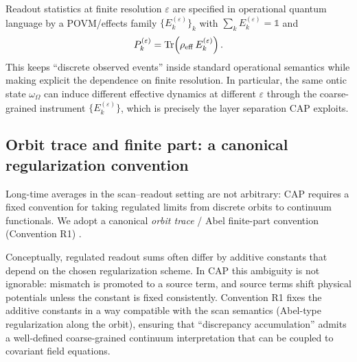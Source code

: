 Readout statistics at finite resolution $\varepsilon$ are specified in operational quantum language by a POVM/effects family $\{E_k^{(\varepsilon)}\}_k$ with $\sum_k E_k^{(\varepsilon)}=\mathds{1}$ and
\begin{equation}
  P_k^{(\varepsilon)} = \mathrm{Tr}\!\left(\rho_{\mathrm{eff}}\, E_k^{(\varepsilon)}\right).
\end{equation}
This keeps ``discrete observed events'' inside standard operational semantics while making explicit the dependence on finite resolution. In particular, the same ontic state $\omega_\Omega$ can induce different effective dynamics at different $\varepsilon$ through the coarse-grained instrument $\{E_k^{(\varepsilon)}\}$, which is precisely the layer separation CAP exploits.

\subsection{Orbit trace and finite part: a canonical regularization convention}
\label{subsec:orbit_trace}

Long-time averages in the scan--readout setting are not arbitrary: CAP requires a fixed convention for taking regulated limits from discrete orbits to continuum functionals. We adopt a canonical \emph{orbit trace} / Abel finite-part convention (Convention R1) \cite{Ma2025HPOT,Ma2025HPA,EstradaKanwal2002}.

Conceptually, regulated readout sums often differ by additive constants that depend on the chosen regularization scheme. In CAP this ambiguity is not ignorable: mismatch is promoted to a source term, and source terms shift physical potentials unless the constant is fixed consistently. Convention R1 fixes the additive constants in a way compatible with the scan semantics (Abel-type regularization along the orbit), ensuring that ``discrepancy accumulation'' admits a well-defined coarse-grained continuum interpretation that can be coupled to covariant field equations.


